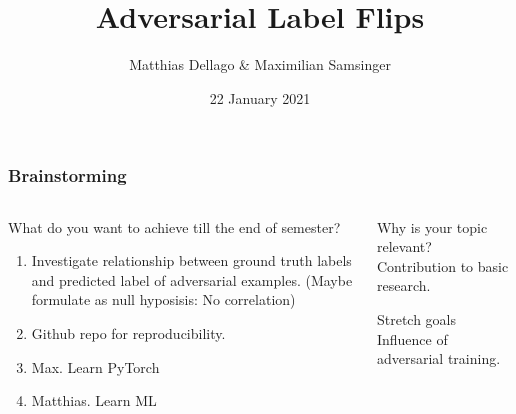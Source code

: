 \documentclass[10pt,usepdftitle=false,aspectratio=169]{beamer}
\title{Adversarial Label Flips}
\author{Matthias Dellago \& Maximilian Samsinger}
\date{22 January 2021}
\begin{document}
\DeclarePairedDelimiter\abs{\lvert}{\rvert}%
\DeclarePairedDelimiter\norm{\lVert}{\rVert}%
\DeclarePairedDelimiter\ceil{\lceil}{\rceil}
\DeclarePairedDelimiter\floor{\lfloor}{\rfloor}

\begin{frame}[plain]
	\maketitle
\end{frame}	

\begin{frame}[fragile]
	\frametitle{Brainstorming}
	\begin{columns}
		\begin{column}{.5\columnwidth}
			\begin{alertblock}{What do you want to achieve till the end of semester?}
				\begin{enumerate}
					\item Investigate relationship between ground truth labels and predicted label of adversarial examples. (Maybe formulate as null hyposisis: No correlation)
					\item Github repo for reproducibility.
					\item Max. Learn PyTorch
					\item Matthias. Learn ML  
				\end{enumerate}
			\end{alertblock}
		\end{column}
		\begin{column}{.5\columnwidth}
			\begin{block}{Why is your topic relevant?}
				Contribution to basic research. 
			\end{block}
			\begin{alertblock}{Stretch goals}
			Influence of adversarial training.
			\end{alertblock}
		\end{column}
	\end{columns}
\end{frame}
\end{document}
